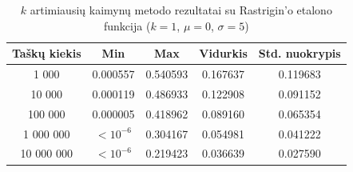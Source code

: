 \begin{table}[H]
    \centering
    \begin{tabular}{|c|c|c|c|c|}
        \hline
        \textbf{Taškų kiekis} & \textbf{Min} & \textbf{Max} & \textbf{Vidurkis} & \textbf{Std. nuokrypis} \\ \hline
        1 000        & 0.000557 & 0.540593 & 0.167637 & 0.119683 \\ \hline
        10 000       & 0.000119 & 0.486933 & 0.122908 & 0.091152 \\ \hline
        100 000      & 0.000005 & 0.418962 & 0.089160 & 0.065354 \\ \hline
        1 000 000    & $<10^{-6}$ & 0.304167 & 0.054981 & 0.041222 \\ \hline
        10 000 000   & $<10^{-6}$ & 0.219423 & 0.036639 & 0.027590 \\ \hline
    \end{tabular}
    \caption{$k$ artimiausių kaimynų metodo rezultatai su Rastrigin'o etalono funkcija ($k = 1$, $\mu = 0$, $\sigma = 5$)}
\end{table}